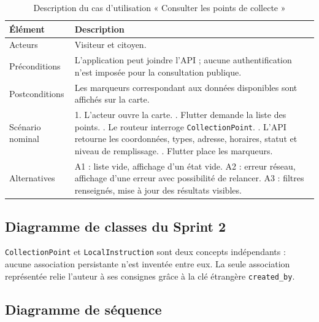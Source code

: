 \begin{longtable}{|p{3.2cm}|p{10.2cm}|}
\caption{Description du cas d'utilisation « Consulter les points de collecte »}\label{tab:r1_uc_points}\\
\hline\rowcolor{gray!20}\textbf{Élément} & \textbf{Description}\\\hline
Acteurs & Visiteur et citoyen.\\\hline
Préconditions & L'application peut joindre l'API ; aucune authentification n'est imposée pour la consultation publique.\\\hline
Postconditions & Les marqueurs correspondant aux données disponibles sont affichés sur la carte.\\\hline
Scénario nominal & 1. L'acteur ouvre la carte. \newline 2. Flutter demande la liste des points. \newline 3. Le routeur interroge \texttt{CollectionPoint}. \newline 4. L'API retourne les coordonnées, types, adresse, horaires, statut et niveau de remplissage. \newline 5. Flutter place les marqueurs.\\\hline
Alternatives & A1 : liste vide, affichage d'un état vide. \newline A2 : erreur réseau, affichage d'une erreur avec possibilité de relancer. \newline A3 : filtres renseignés, mise à jour des résultats visibles.\\\hline
\end{longtable}

\subsection{Diagramme de classes du Sprint 2}

\texttt{CollectionPoint} et \texttt{LocalInstruction} sont deux concepts indépendants : aucune association persistante n'est inventée entre eux. La seule association représentée relie l'auteur à ses consignes grâce à la clé étrangère \texttt{created\_by}.

\label{fig:r1_s2_class}

\subsection{Diagramme de séquence}

